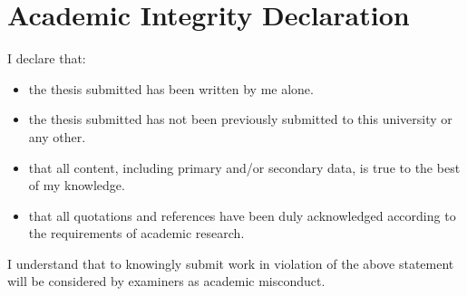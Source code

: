 \documentclass[12pt]{article}
\begin{document}


\clearpage
\pagestyle{plain}
\pagestyle{fancy}
\fancyhead[R]{} 
\fancyhead[L]{}
\clearpage



\section*{Academic Integrity Declaration}

I declare that:

\begin{itemize}
  \item  the thesis submitted has been written by me alone.
  \item  the thesis submitted has not been previously submitted to this university or any
other.
\item  that all content, including primary and/or secondary data, is true to the best of my
knowledge.
\item  that all quotations and references have been duly acknowledged according to the
requirements of academic research.
\end{itemize} 

I understand that to knowingly submit work in violation of the above statement will be
considered by examiners as academic misconduct.



\clearpage
\pagestyle{plain}
\pagestyle{fancy}
\fancyhead[L]{}
\clearpage

\end{document}
